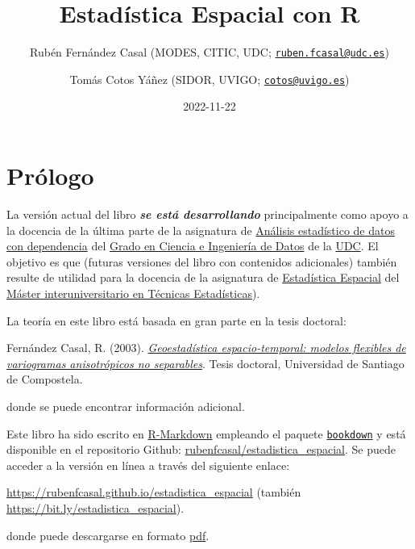 \documentclass[
  spanish,
]{book}
\title{Estadística Espacial con R}
\author{Rubén Fernández Casal (MODES, CITIC, UDC; \href{mailto:ruben.fcasal@udc.es}{\nolinkurl{ruben.fcasal@udc.es}}) \and Tomás Cotos Yáñez (SIDOR, UVIGO; \href{mailto:cotos@uvigo.es}{\nolinkurl{cotos@uvigo.es}})}
\date{2022-11-22}
\theoremstyle{break}
\theoremstyle{definition}
\theoremstyle{definition}
\theoremstyle{definition}
\theoremstyle{definition}
\theoremstyle{remark}
\begin{document}
\maketitle

{
\setcounter{tocdepth}{1}
\tableofcontents
}
\hypertarget{pruxf3logo}{%
\chapter*{Prólogo}\label{pruxf3logo}}

La versión actual del libro \textbf{\emph{se está desarrollando}} principalmente como apoyo a la docencia de la última parte de la asignatura de \href{https://guiadocente.udc.es/guia_docent/index.php?centre=614\&ensenyament=614G02\&assignatura=614G02022\&idioma=cast}{Análisis estadístico de datos con dependencia} del \href{https://estudos.udc.es/es/study/start/614G02V01}{Grado en Ciencia e Ingeniería de Datos} de la \href{https://www.udc.es}{UDC}.
El objetivo es que (futuras versiones del libro con contenidos adicionales) también resulte de utilidad para la docencia de la asignatura de \href{http://eamo.usc.es/pub/mte/index.php?option=com_content\&view=article\&id=2202\&idm=15\&a\%C3\%B1o=2021}{Estadística Espacial} del \href{http://eio.usc.es/pub/mte}{Máster interuniversitario en Técnicas Estadísticas}).

La teoría en este libro está basada en gran parte en la tesis doctoral:

Fernández Casal, R. (2003). \href{https://rubenfcasal.github.io/files/Geoestadistica_espacio-temporal.pdf}{\emph{Geoestadística espacio-temporal: modelos flexibles de variogramas anisotrópicos no separables}}. Tesis doctoral, Universidad de Santiago de Compostela.

donde se puede encontrar información adicional.

Este libro ha sido escrito en \href{http://rmarkdown.rstudio.com}{R-Markdown} empleando el paquete \href{https://bookdown.org/yihui/bookdown/}{\texttt{bookdown}} y está disponible en el repositorio Github: \href{https://github.com/rubenfcasal/estadistica_espacial}{rubenfcasal/estadistica\_espacial}.
Se puede acceder a la versión en línea a través del siguiente enlace:

\url{https://rubenfcasal.github.io/estadistica_espacial} (también \url{https://bit.ly/estadistica_espacial}).

donde puede descargarse en formato \href{https://rubenfcasal.github.io/estadistica_espacial/estadistica_espacial.pdf}{pdf}.
\end{document}
